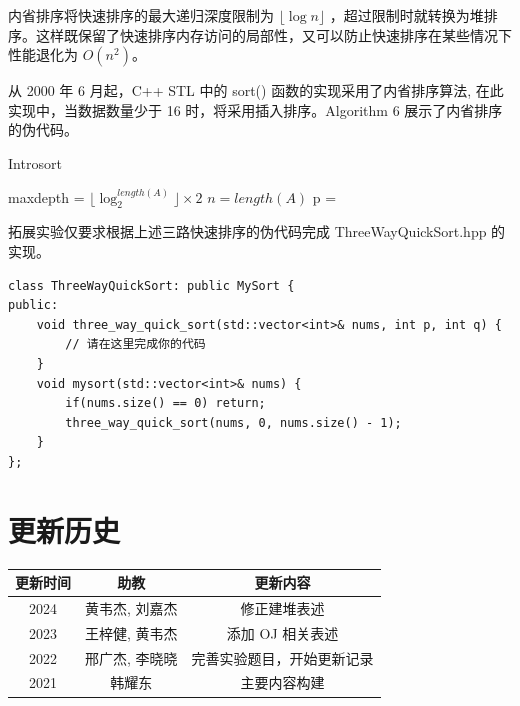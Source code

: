 \documentclass[12pt,a4paper]{article}
\begin{document}
内省排序将快速排序的最大递归深度限制为 $\lfloor \log n \rfloor$ ，超过限制时就转换为堆排序。这样既保留了快速排序内存访问的局部性，又可以防止快速排序在某些情况下性能退化为 $O(n^2)$。

从 2000 年 6 月起，C++ STL 中的 sort() 函数的实现采用了内省排序算法, 在此实现中，当数据数量少于 16 时，将采用插入排序。Algorithm 6 展示了内省排序的伪代码。


\begin{algorithm}[h]
    \caption{Introsort}
    \begin{algorithmic}[1]
        \State maxdepth = $\lfloor \log_2^{length(A)} \rfloor \times 2$
        \State{}
        \EndFunction
        \State $n = length(A)$
        \State{}
        \State {}
        \Else
        \State p = 
        \State {}
        \State {}
        \EndIf
        \EndFunction
    \end{algorithmic}
\end{algorithm}

拓展实验仅要求根据上述三路快速排序的伪代码完成 ThreeWayQuickSort.hpp 的实现。

\begin{lstlisting}
class ThreeWayQuickSort: public MySort {
public:
    void three_way_quick_sort(std::vector<int>& nums, int p, int q) {
        // 请在这里完成你的代码
    }
    void mysort(std::vector<int>& nums) {
        if(nums.size() == 0) return;
        three_way_quick_sort(nums, 0, nums.size() - 1);
    }
};
\end{lstlisting}

\section*{更新历史}

\begin{center}
    \begin{tabular}{|c|c|c|}
        \hline
        \textbf{更新时间} & \textbf{助教} & \textbf{更新内容} \\
        \hline
        2024 & 黄韦杰, 刘嘉杰 & 修正建堆表述\\
        2023 & 王梓健, 黄韦杰 & 添加 OJ 相关表述 \\
        2022 & 邢广杰, 李晓晓 & 完善实验题目，开始更新记录 \\
        2021 & 韩耀东 & 主要内容构建 \\
        \hline
        \end{tabular}
\end{center}
\end{document}
